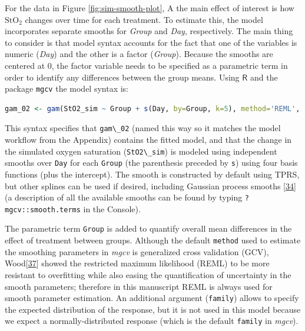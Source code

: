 \documentclass[
]{article}
\newcommand{\passthrough}[1]{#1}
\begin{document}
For the data in Figure \ref{fig:sim-smooth-plot}, A the main effect of interest is how \(\mbox{StO}_2\) changes over time for each treatment. To estimate this, the model incorporates separate smooths for \emph{Group} and \emph{Day}, respectively. The main thing to consider is that model syntax accounts for the fact that one of the variables is numeric (\emph{Day}) and the other is a factor (\emph{Group}). Because the smooths are centered at 0, the factor variable needs to be specified as a parametric term in order to identify any differences between the group means. Using \(\textsf{R}\) and the package \passthrough{\lstinline!mgcv!} the model syntax is:

\begin{lstlisting}[language=R]
gam_02 <- gam(StO2_sim ~ Group + s(Day, by=Group, k=5), method='REML', data = dat_sim)
\end{lstlisting}

This syntax specifies that \passthrough{\lstinline!gam\_02!} (named this way so it matches the model workflow from the Appendix) contains the fitted model, and that the change in the simulated oxygen saturation (\passthrough{\lstinline!StO2\_sim!}) is modeled using independent smooths over \passthrough{\lstinline!Day!} for each \passthrough{\lstinline!Group!} (the parenthesis preceded by \passthrough{\lstinline!s!}) using four basis functions (plus the intercept). The smooth is constructed by default using TPRS, but other splines can be used if desired, including Gaussian process smooths {[}\protect\hyperlink{ref-simpson2018}{34}{]} (a description of all the available smooths can be found by typing \passthrough{\lstinline!?mgcv::smooth.terms!} in the Console).

The parametric term \passthrough{\lstinline!Group!} is added to quantify overall mean differences in the effect of treatment between groups. Although the default \passthrough{\lstinline!method!} used to estimate the smoothing parameters in \emph{mgcv} is generalized cross validation (GCV), Wood{[}\protect\hyperlink{ref-wood2017}{37}{]} showed the restricted maximum likelihood (REML) to be more resistant to overfitting while also easing the quantification of uncertainty in the smooth parameters; therefore in this manuscript REML is always used for smooth parameter estimation. An additional argument (\passthrough{\lstinline!family!}) allows to specify the expected distribution of the response, but it is not used in this model because we expect a normally-distributed response (which is the default \passthrough{\lstinline!family!} in \emph{mgcv}).
\end{document}
